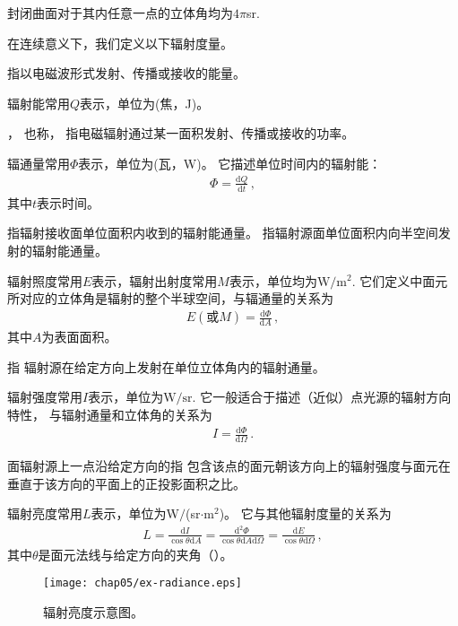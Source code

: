\begin{corollary}
      封闭曲面对于其内任意一点的立体角均为$4\pi$sr.
\end{corollary}

在连续意义下，我们定义以下辐射度量。

\begin{definition}
      指以电磁波形式发射、传播或接收的能量。
\end{definition}
辐射能常用$Q$表示，单位为(焦，J)。

\begin{definition}
      ，
      也称，
      指电磁辐射通过某一面积发射、传播或接收的功率。
\end{definition}
辐通量常用$\varPhi$表示，单位为(瓦，W)。
它描述单位时间内的辐射能：
\begin{align}
      \varPhi=\frac{\mathrm{d}Q}{\mathrm{d}t}\, ,
\end{align}
其中$t$表示时间。

\begin{definition}
      指辐射接收面单位面积内收到的辐射能通量。
      指辐射源面单位面积内向半空间发射的辐射能通量。
\end{definition}
辐射照度常用$E$表示，辐射出射度常用$M$表示，单位均为$\text{W}/\text{m}^2$.
它们定义中面元所对应的立体角是辐射的整个半球空间，与辐通量的关系为
\begin{align}
      E(\text{或}M)=\frac{\mathrm{d}\varPhi}{\mathrm{d}A}\, ,
\end{align}
其中$A$为表面面积。

\begin{definition}
      指
      辐射源在给定方向上发射在单位立体角内的辐射通量。
\end{definition}
辐射强度常用$I$表示，单位为$\text{W}/\text{sr}$.
它一般适合于描述（近似）点光源的辐射方向特性，
与辐射通量和立体角的关系为
\begin{align}
      I=\frac{\mathrm{d}\varPhi}{\mathrm{d}\varOmega}\, .
\end{align}

\begin{definition}
      面辐射源上一点沿给定方向的指
      包含该点的面元朝该方向上的辐射强度与面元在垂直于该方向的平面上的正投影面积之比。
\end{definition}
辐射亮度常用$L$表示，单位为W$/$(sr$\cdot$m$^2$)。
它与其他辐射度量的关系为
\begin{align}\label{eq:5.ex-radiance}
      L=\frac{\mathrm{d}I}{\cos\theta\mathrm{d}A}=\frac{\mathrm{d}^2\varPhi}{\cos\theta\mathrm{d}A\mathrm{d}\varOmega}=\frac{\mathrm{d}E}{\cos\theta\mathrm{d}\varOmega}\, ,
\end{align}
其中$\theta$是面元法线与给定方向的夹角（）。
\begin{figure}[htbp]
      \centering\texttt{[image: chap05/ex-radiance.eps]}
      \caption{辐射亮度示意图。}
      \label{fig:5.ex01-add01}
\end{figure}

